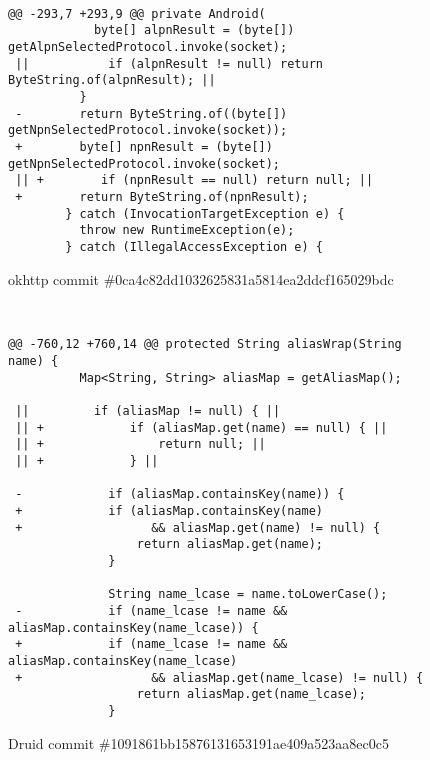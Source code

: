 
\begin{figure*}
\begin{lstlisting}[moredelim={[is][keywordstyle]{||}{||}}]

@@ -293,7 +293,9 @@ private Android(
            byte[] alpnResult = (byte[]) getAlpnSelectedProtocol.invoke(socket);
 ||           if (alpnResult != null) return ByteString.of(alpnResult); ||
          }
 -        return ByteString.of((byte[]) getNpnSelectedProtocol.invoke(socket));
 +        byte[] npnResult = (byte[]) getNpnSelectedProtocol.invoke(socket);
 || +        if (npnResult == null) return null; ||
 +        return ByteString.of(npnResult);
        } catch (InvocationTargetException e) {
          throw new RuntimeException(e);
        } catch (IllegalAccessException e) {
\end{lstlisting}
\caption{okhttp commit \#0ca4c82dd1032625831a5814ea2ddcf165029bdc\label{fig:null2}}
\end{figure*}


\begin{figure*}
\begin{lstlisting}[moredelim={[is][keywordstyle]{||}{||}}]


@@ -760,12 +760,14 @@ protected String aliasWrap(String name) {
          Map<String, String> aliasMap = getAliasMap();
  
 ||         if (aliasMap != null) { ||
 || +            if (aliasMap.get(name) == null) { ||
 || +                return null; ||
 || +            } ||

 -            if (aliasMap.containsKey(name)) {
 +            if (aliasMap.containsKey(name)
 +            		&& aliasMap.get(name) != null) {
                  return aliasMap.get(name);
              }
              
              String name_lcase = name.toLowerCase();
 -            if (name_lcase != name && aliasMap.containsKey(name_lcase)) {
 +            if (name_lcase != name && aliasMap.containsKey(name_lcase)
 +            		&& aliasMap.get(name_lcase) != null) {
                  return aliasMap.get(name_lcase);
              }

\end{lstlisting}
\caption{Druid commit \#1091861bb15876131653191ae409a523aa8ec0c5\label{fig:null1}}
\end{figure*}

